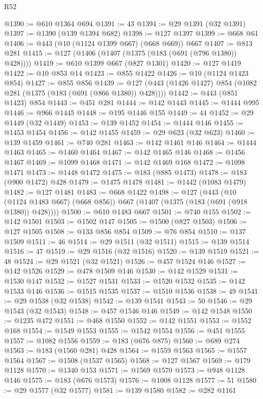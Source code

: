 \begin{lexlean}{R52}
\begin{coremodule}
{{{{{{{{{{{{{{{{{{{{{{{{{{{{{{{{{{{{{{{{{{{{{{{{{{{{{{{{{{{{{{{{{{{{{{{{{{{{{{{{{{{{{{{{{{{{{{{{{{{{{{{{{{{{{{{{{{{{{{{{{{{{{{{{{{{{{{{{{{{{{{{{{{{{{{{{{{{{{{{{{{{{{{{{{{{{{{{{{{{{{{{{{{{{{{{{{{{{{{@1390 := @610 @1364 @694
@1391 := 43
@1394 := @29 @1391 (@32 @1391)
@1397 := @1390 (@139 @1394 @682)
@1398 := @127 @1397
@1399 := @668 @61
@1406 := @443 (@10 (@1124 @1399 @667) (@668 @669)) @667
@1407 := @813 @281
@1415 := @127 (@1406 (@1407 (@1375 (@183 (@691 (@796 @1380)) @428))))
@1419 := @610 @1399 @667 (@827 @1301)
@1420 := @127 @1419
@1422 := @10 @853 @14
@1423 := @855 @1422
@1426 := @10 (@1124 @1423 @854)
@1427 := @855 @856
@1439 := @127 (@443 (@1426 @1427) @854 (@1082 @281 (@1375 (@183 (@691 (@866 @1380)) @428))))
@1442 := @443 (@851 @1423) @854
@1443 := @451 @281
@1444 := @142 @1443
@1445 := @1444 @995
@1446 := @966 @1445
@1448 := @195 @1446 @155
@1449 := 44
@1452 := @29 @1449 (@32 @1449)
@1453 := @139 @1452
@1454 := @1444 @146
@1455 := @1453 @1454
@1456 := @142 @1455
@1459 := @29 @623 (@32 @623)
@1460 := @139 @1459
@1461 := @740 @281
@1463 := @142 @1461 @146
@1464 := @1444 @1463
@1465 := @1460 @1464
@1467 := @142 @1465 @146
@1468 := @1456 @1467
@1469 := @1099 @1468
@1471 := @142 @1469 @168
@1472 := @1098 @1471
@1473 := @1448 @1472
@1475 := @183 (@885 @1473)
@1478 := @183 (@900 @1472) @428
@1479 := @1475 @1478
@1481 := @1442 (@1083 @1479)
@1482 := @127 @1481
@1483 := @668 @1422
@1498 := @127
    (@443 (@10 (@1124 @1483 @667) (@668 @856)) @667 (@1407 (@1375 (@183 (@691 (@918 @1380)) @428))))
@1500 := @610 @1483 @667
@1501 := @740 @155
@1502 := @142 @1501
@1503 := @1502 @147
@1505 := @1500 (@827 @1503)
@1506 := @127 @1505
@1508 := @133 @856 @854
@1509 := @76 @854
@1510 := @137 @1509
@1511 := 46
@1514 := @29 @1511 (@32 @1511)
@1515 := @139 @1514
@1516 := 47
@1519 := @29 @1516 (@32 @1516)
@1520 := @139 @1519
@1521 := 48
@1524 := @29 @1521 (@32 @1521)
@1526 := @457 @1524 @146
@1527 := @142 @1526
@1529 := @478 @1509 @146
@1530 := @142 @1529
@1531 := @1530 @147
@1532 := @1527 @1531
@1533 := @1520 @1532
@1535 := @142 @1533 @146
@1536 := @1515 @1535
@1537 := @1510 @1536
@1538 := 49
@1541 := @29 @1538 (@32 @1538)
@1542 := @139 @1541
@1543 := 50
@1546 := @29 @1543 (@32 @1543)
@1548 := @457 @1546 @146
@1549 := @142 @1548
@1550 := @1235 @472
@1551 := @468 @1550
@1552 := @142 @1551
@1553 := @1552 @168
@1554 := @1549 @1553
@1555 := @1542 @1554
@1556 := @451 @1555
@1557 := @1082 @1556
@1559 := @183 (@676 @875)
@1560 := @689 @274
@1563 := @183 (@1560 @281) @428
@1564 := @1559 @1563
@1565 := @1557 @1564
@1567 := @1508 (@1537 @1565)
@1568 := @127 @1567
@1569 := @179 @1128
@1570 := @1340 @153
@1571 := @1569 @1570
@1573 := @948 @1128 @146
@1575 := @183 (@676 @1573)
@1576 := @1008 @1128
@1577 := 51
@1580 := @29 @1577 (@32 @1577)
@1581 := @139 @1580
@1582 := @282 @1161
}}}}}}}}}}}}}}}}}}}}}}}}}}}}}}}}}}}}}}}}}}}}}}}}}}}}}}}}}}}}}}}}}}}}}}}}}}}}}}}}}}}}}}}}}}}}}}}}}}}}}}}}}}}}}}}}}}}}}}}}}}}}}}}}}}}}}}}}}}}}}}}}}}}}}}}}}}}}}}}}}}}}}}}}}}}}}}}}}}}}}}}}}}}}}}}}}}}}}}
\end{coremodule}
\end{lexlean}

